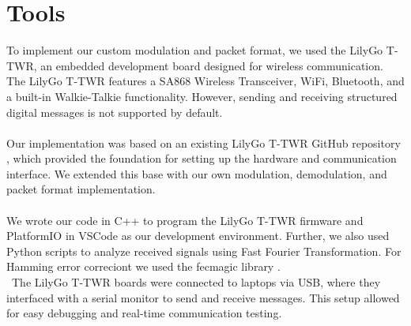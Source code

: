 \section{Tools}
To implement our custom modulation and packet format, we used the LilyGo T-TWR, an embedded development board designed for wireless communication. The LilyGo T-TWR features a SA868 Wireless Transceiver, WiFi, Bluetooth, and a built-in Walkie-Talkie functionality. However, sending and receiving structured digital messages is not supported by default.
\\ \\
Our implementation was based on an existing LilyGo T-TWR GitHub repository \cite{lilygo2024}, which provided the foundation for setting up the hardware and communication interface. We extended this base with our own modulation, demodulation, and packet format implementation.
\\ \\
We wrote our code in C++ to program the LilyGo T-TWR firmware and PlatformIO in VSCode as our development environment. Further, we also used Python scripts to analyze received signals using Fast Fourier Transformation. For Hamming error correciont we used the fecmagic library \cite{kristof2020}.
\\ \ 
The LilyGo T-TWR boards were connected to laptops via USB, where they interfaced with a serial monitor to send and receive messages. This setup allowed for easy debugging and real-time communication testing.

